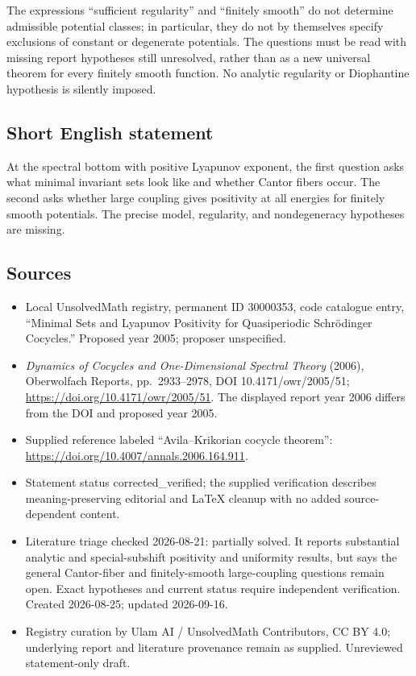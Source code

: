 \documentclass[11pt]{article}
\begin{document}
The expressions ``sufficient regularity'' and ``finitely smooth'' do not determine admissible potential classes; in particular, they do not by themselves specify exclusions of constant or degenerate potentials. The questions must be read with missing report hypotheses still unresolved, rather than as a new universal theorem for every finitely smooth function. No analytic regularity or Diophantine hypothesis is silently imposed.
\subsection{Short English statement}
At the spectral bottom with positive Lyapunov exponent, the first question asks what minimal invariant sets look like and whether Cantor fibers occur. The second asks whether large coupling gives positivity at all energies for finitely smooth potentials. The precise model, regularity, and nondegeneracy hypotheses are missing.
\subsection{Sources}
\begin{itemize}
\item Local UnsolvedMath registry, permanent ID 30000353, code catalogue entry, ``Minimal Sets and Lyapunov Positivity for Quasiperiodic Schr\"odinger Cocycles.'' Proposed year 2005; proposer unspecified.
\item \emph{Dynamics of Cocycles and One-Dimensional Spectral Theory} (2006), Oberwolfach Reports, pp.\ 2933--2978, DOI 10.4171/owr/2005/51; \url{https://doi.org/10.4171/owr/2005/51}. The displayed report year 2006 differs from the DOI and proposed year 2005.
\item Supplied reference labeled ``Avila--Krikorian cocycle theorem'': \url{https://doi.org/10.4007/annals.2006.164.911}.
\item Statement status corrected\_verified; the supplied verification describes meaning-preserving editorial and LaTeX cleanup with no added source-dependent content.
\item Literature triage checked 2026-08-21: partially solved. It reports substantial analytic and special-subshift positivity and uniformity results, but says the general Cantor-fiber and finitely-smooth large-coupling questions remain open. Exact hypotheses and current status require independent verification. Created 2026-08-25; updated 2026-09-16.
\item Registry curation by Ulam AI / UnsolvedMath Contributors, CC BY 4.0; underlying report and literature provenance remain as supplied. Unreviewed statement-only draft.
\end{itemize}
\end{document}
